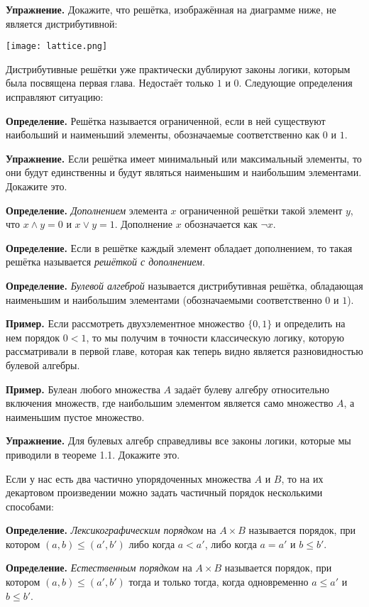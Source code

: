 {\bfseries Упражнение.} Докажите, что решётка, изображённая на диаграмме ниже, не является дистрибутивной:

\texttt{[image: lattice.png]}

Дистрибутивные решётки уже практически дублируют законы логики, которым была посвящена первая глава. Недостаёт только $1$ и $0$. Следующие определения исправляют ситуацию:

{\bfseries Определение.} Решётка называется ограниченной, если в ней существуют наибольший и наименьший элементы, обозначаемые соответственно как $0$ и $1$.

{\bfseries Упражнение.} Если решётка имеет минимальный или максимальный элементы, то они будут единственны и будут являться наименьшим и наибольшим элементами. Докажите это.

{\bfseries Определение.} {\slshape Дополнением} элемента $x$ ограниченной решётки такой элемент $y$, что $x\wedge y = 0$ и $x \vee y = 1$. Дополнение $x$ обозначается как $\neg x$.

{\bfseries Определение.} Если в решётке каждый элемент обладает дополнением, то такая решётка называется {\slshape решёткой с дополнением}.

{\bfseries Определение.} {\slshape Булевой алгеброй} называется дистрибутивная решётка, обладающая наименьшим и наибольшим элементами (обозначаемыми соответственно $0$ и $1$).

{\bfseries Пример.} Если рассмотреть двухэлементное множество $\{0, 1\}$ и определить на нем порядок $0 < 1$, то мы получим в точности классическую логику, которую рассматривали в первой главе, которая как теперь видно является разновидностью булевой алгебры.

{\bfseries Пример.} Булеан любого множества $A$ задаёт булеву алгебру относительно включения множеств, где наибольшим элементом является само множество $A$, а наименьшим пустое множество.

{\bfseries Упражнение.} Для булевых алгебр справедливы все законы логики, которые мы приводили в теореме 1.1. Докажите это.

Если у нас есть два частично упорядоченных множества $A$ и $B$, то на их декартовом произведении можно задать частичный порядок несколькими способами:

{\bfseries Определение.} {\slshape Лексикографическим порядком} на $A\times B$ называется порядок, при котором $(a, b) \le (a', b')$ либо когда $a < a'$, либо когда $a=a'$ и $b\le b'$.

{\bfseries Определение.} {\slshape Естественным порядком} на $A\times B$ называется порядок, при котором $(a, b) \le (a', b')$ тогда и только тогда, когда одновременно $a \le a'$ и $b \le b'$.

